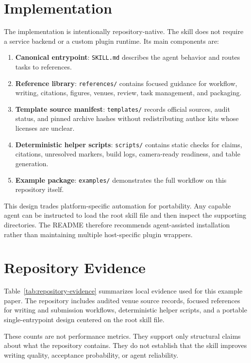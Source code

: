 \documentclass{article}
\begin{document}
\section{Implementation}

The implementation is intentionally repository-native. The skill does not require a service backend or a custom plugin runtime. Its main components are:
\begin{enumerate}
  \item \textbf{Canonical entrypoint}: \texttt{SKILL.md} describes the agent behavior and routes tasks to references.
  \item \textbf{Reference library}: \texttt{references/} contains focused guidance for workflow, writing, citations, figures, venues, review, task management, and packaging.
  \item \textbf{Template source manifest}: \texttt{templates/} records official sources, audit status, and pinned archive hashes without redistributing author kits whose licenses are unclear.
  \item \textbf{Deterministic helper scripts}: \texttt{scripts/} contains static checks for claims, citations, unresolved markers, build logs, camera-ready readiness, and table generation.
  \item \textbf{Example package}: \texttt{examples/} demonstrates the full workflow on this repository itself.
\end{enumerate}

This design trades platform-specific automation for portability. Any capable agent can be instructed to load the root skill file and then inspect the supporting directories. The README therefore recommends agent-assisted installation rather than maintaining multiple host-specific plugin wrappers.

\section{Repository Evidence}

Table~\ref{tab:repository-evidence} summarizes local evidence used for this example paper. The repository includes audited venue source records, focused references for writing and submission workflows, deterministic helper scripts, and a portable single-entrypoint design centered on the root skill file.



These counts are not performance metrics. They support only structural claims about what the repository contains. They do not establish that the skill improves writing quality, acceptance probability, or agent reliability.
\end{document}
